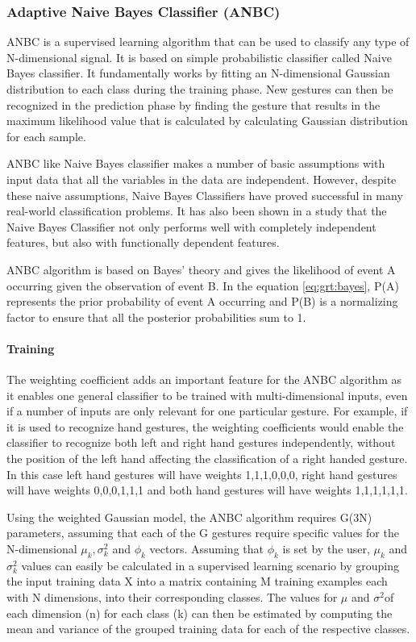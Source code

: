 \subsubsection{Adaptive Naive Bayes Classifier (ANBC)} \label{sec:anbc} ANBC is a supervised learning algorithm that can be used to classify any type of N-dimensional signal. It is based on simple probabilistic classifier called Naive Bayes classifier. It fundamentally works by fitting an N-dimensional Gaussian distribution to each class during the training phase. New gestures can then be recognized in the prediction phase by finding the gesture that results in the maximum likelihood value that is calculated by calculating Gaussian distribution for each sample. 

ANBC like Naive Bayes classifier makes a number of basic assumptions with input data that all the variables in the data are independent. However, despite these naive assumptions, Naive Bayes Classifiers have proved successful in many real-world classification problems. It has also been shown in a study that the Naive Bayes Classifier not only performs well with completely independent features, but also with functionally dependent features.

ANBC algorithm is based on Bayes' theory and gives the likelihood of event A occurring given the observation of event B. In the equation \ref{eq:grt:bayes}, P(A) represents the prior probability of event A occurring and P(B) is a normalizing factor to ensure that all the posterior probabilities sum to 1.



\paragraph*{Training} The weighting coefficient adds an important feature for the ANBC algorithm as it enables one general classifier to be trained with multi-dimensional inputs, even if a number of inputs are only relevant for one particular gesture. For example, if it is used to recognize hand gestures, the weighting coefficients would enable the classifier to recognize both left and right hand gestures independently, without the position of the left hand affecting the classification of a right handed gesture. In this case left hand gestures will have weights {1,1,1,0,0,0}, right hand gestures will have weights {0,0,0,1,1,1} and both hand gestures will have weights {1,1,1,1,1,1}.

Using the weighted Gaussian model, the ANBC algorithm requires G(3N) parameters, assuming that each of the G gestures require specific values for the N-dimensional $ \mu_{k} , \sigma_{k}^{2} $ and $ \phi_{k} $ vectors. Assuming that $ \phi_{k} $ is set by the user, $ \mu_{k} $ and $\sigma_{k}^{2} $ values can easily be calculated in a supervised learning scenario by grouping the input training data X into a matrix containing M training examples each with N dimensions, into their corresponding classes. The values for $ \mu$ and $\sigma^{2} $of each dimension (n) for each class (k) can then be estimated by computing the mean and variance of the grouped training data for each of the respective classes.

